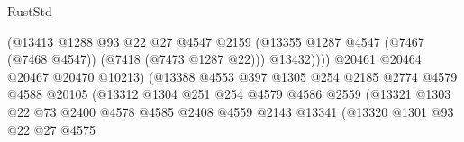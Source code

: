 \begin{lexlean}{RustStd}
\begin{coremodule}
                                              (@13413
                                                @1288
                                                @93
                                                @22
                                                @27
                                                @4547
                                                @2159
                                                (@13355
                                                  @1287
                                                  @4547
                                                  (@7467 (@7468 @4547))
                                                  (@7418 (@7473 @1287 @22)))
                                                @13432))))
                                        @20461
                                        @20464
                                        @20467
                                        @20470
                                        @10213)
                                      (@13388
                                        @4553
                                        @397
                                        @1305
                                        @254
                                        @2185
                                        @2774
                                        @4579
                                        @4588
                                        @20105
                                        (@13312
                                          @1304
                                          @251
                                          @254
                                          @4579
                                          @4586
                                          @2559
                                          (@13321
                                            @1303
                                            @22
                                            @73
                                            @2400
                                            @4578
                                            @4585
                                            @2408
                                            @4559
                                            @2143
                                            @13341
                                            (@13320
                                              @1301
                                              @93
                                              @22
                                              @27
                                              @4575

\end{coremodule}
\end{lexlean}
